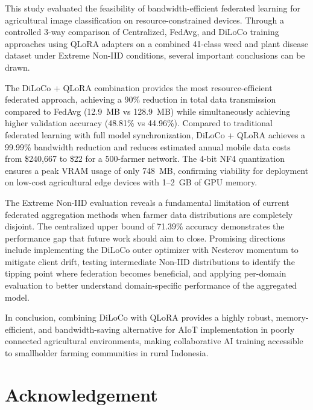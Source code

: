 \documentclass[conference, compsoc, twoside]{IEEEtran}
\begin{document}
This study evaluated the feasibility of bandwidth-efficient federated learning for agricultural image classification on resource-constrained devices. Through a controlled 3-way comparison of Centralized, FedAvg, and DiLoCo training approaches using QLoRA adapters on a combined 41-class weed and plant disease dataset under Extreme Non-IID conditions, several important conclusions can be drawn.

The DiLoCo + QLoRA combination provides the most resource-efficient federated approach, achieving a 90\% reduction in total data transmission compared to FedAvg (12.9~MB vs 128.9~MB) while simultaneously achieving higher validation accuracy (48.81\% vs 44.96\%). Compared to traditional federated learning with full model synchronization, DiLoCo + QLoRA achieves a 99.99\% bandwidth reduction and reduces estimated annual mobile data costs from \$240,667 to \$22 for a 500-farmer network. The 4-bit NF4 quantization ensures a peak VRAM usage of only 748~MB, confirming viability for deployment on low-cost agricultural edge devices with 1--2~GB of GPU memory.

The Extreme Non-IID evaluation reveals a fundamental limitation of current federated aggregation methods when farmer data distributions are completely disjoint. The centralized upper bound of 71.39\% accuracy demonstrates the performance gap that future work should aim to close. Promising directions include implementing the DiLoCo outer optimizer with Nesterov momentum to mitigate client drift, testing intermediate Non-IID distributions to identify the tipping point where federation becomes beneficial, and applying per-domain evaluation to better understand domain-specific performance of the aggregated model.

In conclusion, combining DiLoCo with QLoRA provides a highly robust, memory-efficient, and bandwidth-saving alternative for AIoT implementation in poorly connected agricultural environments, making collaborative AI training accessible to smallholder farming communities in rural Indonesia.

\section*{Acknowledgement}

\balance



\end{document}
